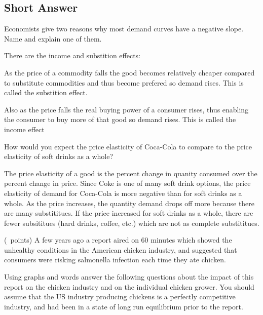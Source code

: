 \begin{questions}
  \section{Short Answer}

  \question[5] Economists give two reasons why most demand curves have
  a negative slope. Name and explain one of them.
  \begin{solution}
    There are the income and substition effects:

    As the price of a commodity falls the good becomes relatively
    cheaper compared to substitute commodities and thus become
    prefered so demand rises. This is called the substition effect.

    Also as the price falls the real buying power of a consumer rises,
    thus enabling the consumer to buy more of that good so demand
    rises. This is called the income effect
  \end{solution}

  \question[5] How would you expect the price elasticity of Coca-Cola
  to compare to the price elasticity of soft drinks as a whole?

  \begin{solution}
    The price elasticity of a good is the percent change in quanity
    consumed over the percent change in price. Since Coke is one of
    many soft drink options, the price elasticity of demand for
    Coca-Cola is more negative than for soft drinks as a whole. As the
    price increases, the quantity demand drops off more because there
    are many substititues. If the price increased for soft drinks as a
    whole, there are fewer subsititues (hard drinks, coffee, etc.)
    which are not as complete substititues.
  \end{solution}

  \question (\totalpoints\ points) A few years ago a report aired on
  60 minutes which showed the unhealthy conditions in the American
  chicken industry, and suggested that consumers were risking
  salmonella infection each time they ate chicken.

  Using graphs and words answer the following questions about the
  impact of this report on the chicken industry and on the individual
  chicken grower. You should assume that the US industry producing
  chickens is a perfectly competitive industry, and had been in a
  state of long run equilibrium prior to the report.

  \begin{parts}
    

\end{parts}
\end{questions}
